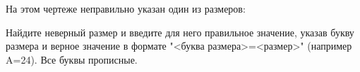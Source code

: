 
На этом чертеже неправильно указан один из размеров:


Найдите неверный размер и введите для него правильное значение, указав букву размера и верное значение в формате "<буква размера>=<размер>" (например A=24).
Все буквы прописные.